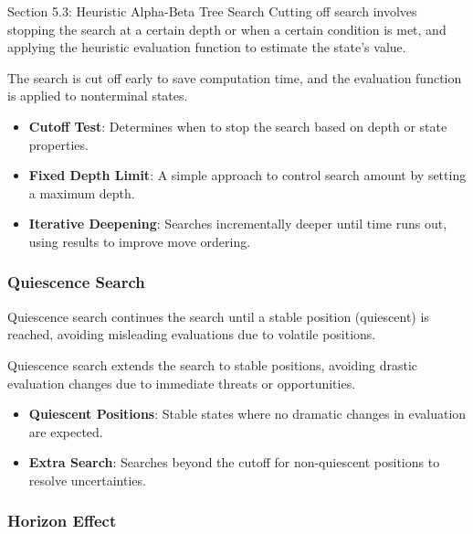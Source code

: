 \begin{notes}{Section 5.3: Heuristic Alpha-Beta Tree Search}
    Cutting off search involves stopping the search at a certain depth or when a certain condition is met, and applying the heuristic evaluation function to estimate the state's value.
    
    \begin{highlight}
        The search is cut off early to save computation time, and the evaluation function is applied to nonterminal states.
        
        \begin{itemize}
            \item \textbf{Cutoff Test}: Determines when to stop the search based on depth or state properties.
            \item \textbf{Fixed Depth Limit}: A simple approach to control search amount by setting a maximum depth.
            \item \textbf{Iterative Deepening}: Searches incrementally deeper until time runs out, using results to improve move ordering.
        \end{itemize}
    \end{highlight}
    
    \subsubsection*{Quiescence Search}
    
    Quiescence search continues the search until a stable position (quiescent) is reached, avoiding misleading evaluations due to volatile positions.
    
    \begin{highlight}
        Quiescence search extends the search to stable positions, avoiding drastic evaluation changes due to immediate threats or opportunities.
        
        \begin{itemize}
            \item \textbf{Quiescent Positions}: Stable states where no dramatic changes in evaluation are expected.
            \item \textbf{Extra Search}: Searches beyond the cutoff for non-quiescent positions to resolve uncertainties.
        \end{itemize}
    \end{highlight}
    
    \subsubsection*{Horizon Effect}
    

\end{notes}
